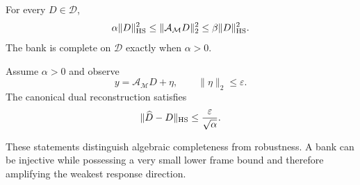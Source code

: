 \begin{theorem}
For every $D\in\mathcal D$,
\[
 \alpha\|D\|_{\mathrm{HS}}^2
 \le \|\mathcal A_{\mathcal M}D\|_2^2
 \le \beta\|D\|_{\mathrm{HS}}^2.
\]
The bank is complete on $\mathcal D$ exactly when $\alpha>0$.
\end{theorem}

\begin{corollary}
Assume $\alpha>0$ and observe
\[
 y=\mathcal A_{\mathcal M}D+\eta,
 \qquad
 \|\eta\|_2\le\varepsilon.
\]
The canonical dual reconstruction satisfies
\[
 \|\widehat D-D\|_{\mathrm{HS}}
 \le \frac{\varepsilon}{\sqrt\alpha}.
\]
\end{corollary}

These statements distinguish algebraic completeness from robustness. A bank can be injective while possessing a very small lower frame bound and therefore amplifying the weakest response direction.

